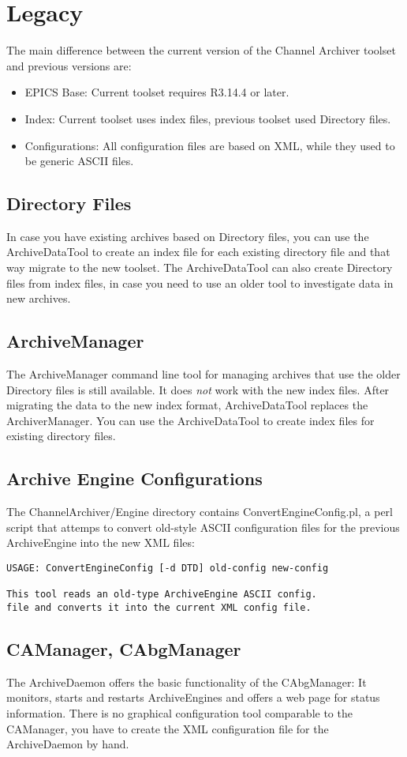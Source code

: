 \chapter{Legacy}
The main difference between the current version of the Channel Archiver toolset
and previous versions are:
\begin{itemize}
\item EPICS Base: Current toolset requires R3.14.4 or later.
\item Index: Current toolset uses index files, previous toolset
      used Directory files.
\item Configurations: All configuration files are based on XML,
      while they used to be generic ASCII files.
\end{itemize}

\section{Directory Files}
In case you have existing archives based on Directory files,
you can use the ArchiveDataTool to create an index file for each existing directory file
and that way migrate to the new toolset.
The ArchiveDataTool can also create Directory files from index files, in case you
need to use an older tool to investigate data in new archives.

\section{ArchiveManager}
The ArchiveManager command line tool for managing archives that use the
older Directory files is still available.
It does \emph{not} work with the new index files.
After migrating the data to the new index format,
ArchiveDataTool replaces the ArchiverManager. You can use the ArchiveDataTool
to create index files for existing directory files.

\section{Archive Engine Configurations}
The ChannelArchiver/Engine directory contains ConvertEngineConfig.pl,
a perl script that attemps to convert old-style ASCII configuration
files for the previous ArchiveEngine into the new XML files:
\begin{lstlisting}[keywordstyle=\sffamily]
USAGE: ConvertEngineConfig [-d DTD] old-config new-config
 
This tool reads an old-type ArchiveEngine ASCII config.
file and converts it into the current XML config file.
\end{lstlisting}

\section{CAManager, CAbgManager}
The ArchiveDaemon offers the basic functionality of the CAbgManager:
It monitors, starts and restarts ArchiveEngines and offers a web page
for status information.
There is no graphical configuration tool comparable to the CAManager,
you have to create the XML configuration file for the ArchiveDaemon
by hand.

